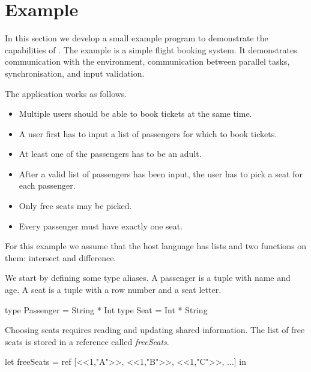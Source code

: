 
\section{Example}


In this section we develop a small example program to demonstrate the capabilities of \TOPHAT.
The example is a simple flight booking system.
It demonstrates communication with the environment, communication between parallel tasks, synchronisation, and input validation.

The application works as follows.
\begin{itemize}
\item Multiple users should be able to book tickets at the same time.
\item A user first has to input a list of passengers for which to book tickets.
\item At least one of the passengers has to be an adult.
\item After a valid list of passengers has been input, the user has to pick a seat for each passenger.
\item Only free seats may be picked.
\item Every passenger must have exactly one seat.
\end{itemize}
For this example we assume that the host language has lists and two functions on them: intersect and difference.

We start by defining some type aliases.
A passenger is a tuple with name and age.
A seat is a tuple with a row number and a seat letter.
\begin{TASK}
  type Passenger = String * Int
  type Seat = Int * String
\end{TASK}

Choosing seats requires reading and updating shared information.
The list of free seats is stored in a reference called \emph{freeSeats}.
\begin{TASK}
  let freeSeats = ref [<<1,"A">>, <<1,"B">>, <<1,"C">>, ...] in
\end{TASK}

